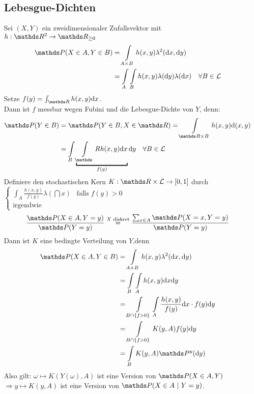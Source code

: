 \subsection{Lebesgue-Dichten}
\label{sub:lebesgue_dichten}
Sei $(X,Y)$ ein zweidimensionaler Zufallsvektor mit  $h:\R^2\to \R_{\ge 0}$\\
\begin{equation*}
\begin{aligned}
	\Pw(X\in A,Y\in B) &= \int\limits_{A\times B}h(x,y)\lambda^2(\dint x,\dint y)\\
	&= \int\limits_A\int\limits_B h(x,y) \lambda(\dint y)\lambda(\dint x)\quad \forall B\in \mathcal{L}
\end{aligned}
\end{equation*}
Setze $f(y)=\int_{\R}h(x,y)\dint x$.\\
Dann ist $f$ messbar wegen Fubini und die Lebesgue-Dichte von $Y$, denn:
\begin{equation*}
\begin{aligned}
	\Pw(Y\in B) &= \Pw(Y\in B,X\in \R)= \int\limits_{\R\times B}h(x,y)\dint(x,y)\\
	&=\int\limits_B\underbracket{\int\limits_\R h(x,y)\dint x}_{f(y)}\dint y \quad \forall B\in \mathcal{L}
\end{aligned}
\end{equation*}
Definiere den stochastischen Kern $K:\R\times \mathcal{L}\to[0,1]$ durch
$\left\{\begin{array}{cl} \int_A \frac{h(x,y)}{f(y)}\lambda(\dint x) & \text{falls } f(y)>0\\ \text{irgendwie}    \end{array}\right.$
\[ 
\frac{\Pw(X\in A,Y=y)}{\Pw(Y=y)}\stackrel{X\text{ diskret}}{=} \frac{\sum_{x\in A}\Pw(X=x,Y=y)}{\Pw(Y=y)} 
\]
Dann ist $K$ eine bedingte Verteilung von $Y$,denn
\begin{equation*}
\begin{aligned}
	\Pw(X\in A,Y\in B) &= \int\limits_{A\times B} h(x,y)\lambda^2(\dint x, \dint y)\\
	&= \int\limits_B\int\limits_Ah(x,y)\dint x \dint y\\
	&= \int\limits_{B\cap\{f>0\}}\int\limits_A \frac{h(x,y)}{f(y)}\dint x \cdot f(y)\dint y\\
	&= \int\limits_{B\cap\{f>0\}}K(y,A)f(y)\dint y\\
	&= \int\limits_BK(y,A)\Pw^y(\dint y)
\end{aligned}
\end{equation*}
Also gilt: $\omega\mapsto K(Y(\omega),A)$ ist eine Version von $\Pw(X\in A,Y)$\\
$\Rightarrow y\mapsto K(y,A)$ ist eine Version von $\Pw(X\in A~|~Y=y)$.

